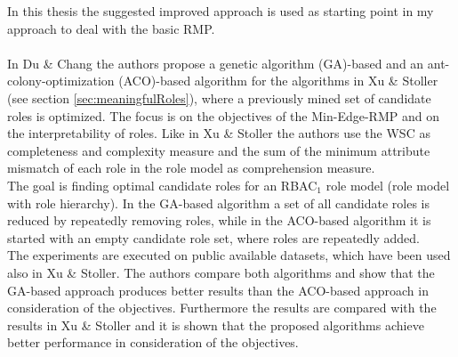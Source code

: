 In this thesis the suggested improved approach is used as starting point in my approach to deal with the basic RMP.\\\\
In Du \& Chang\cite{DuChang} the authors propose a genetic algorithm (GA)-based and an ant-colony-optimization (ACO)-based algorithm for the algorithms in Xu \& Stoller\cite{Xu} (see section \ref{sec:meaningfulRoles}), where a previously mined set of candidate roles is optimized. The focus is on the objectives of the Min-Edge-RMP and on the interpretability of roles. Like in Xu \& Stoller\cite{Xu} the authors use the WSC as completeness and complexity measure and the sum of the minimum attribute mismatch of each role in the role model as comprehension measure.\\
The goal is finding optimal candidate roles for an RBAC$_1$ role model (role model with role hierarchy). In the GA-based algorithm a set of all candidate roles is reduced by repeatedly removing roles, while in the ACO-based algorithm it is started with an empty candidate role set, where roles are repeatedly added.\\
The experiments are executed on public available datasets, which have been used also in Xu \& Stoller\cite{Xu}. The authors compare both algorithms and show that the GA-based approach produces better results than the ACO-based approach in consideration of the objectives. Furthermore the results are compared with the results in Xu \& Stoller\cite{Xu} and it is shown that the proposed algorithms achieve better performance in consideration of the objectives.